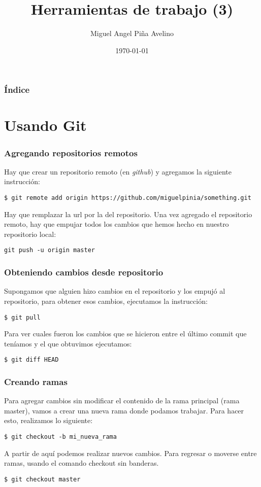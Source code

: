 \documentclass{beamer}
\title[Laboratorio]{Herramientas de trabajo (3)}
\author[Miguel]{Miguel Angel Piña Avelino}
\institute[UNAM]{
  Ingeniería de Software,\\
  Facultad de Ciencias, UNAM
}
\date{\today}
\begin{document}
\frame{\titlepage}
\begin{frame}
  \frametitle{Índice}
  \tableofcontents
\end{frame}

\section{Usando Git}

\begin{frame}[fragile]
  \frametitle{Agregando repositorios remotos}
  Hay que crear un repositorio remoto (en \textit{github}) y agregamos la
  siguiente instrucción:

\begin{verbatim}
$ git remote add origin https://github.com/miguelpinia/something.git
\end{verbatim}

Hay que remplazar la url por la del repositorio. Una vez agregado el repositorio
remoto, hay que empujar todos los cambios que hemos hecho en nuestro repositorio
local:

\begin{verbatim}
git push -u origin master
\end{verbatim}

\end{frame}

\begin{frame}[fragile]
  \frametitle{Obteniendo cambios desde repositorio}

  Supongamos que alguien hizo cambios en el repositorio y los empujó al
repositorio, para obtener esos cambios, ejecutamos la instrucción:

\begin{verbatim}
$ git pull
\end{verbatim}

Para ver cuales fueron los cambios que se hicieron entre el último commit que
teníamos y el que obtuvimos ejecutamos:

\begin{verbatim}
$ git diff HEAD
\end{verbatim}

\end{frame}

\begin{frame}[fragile]
  \frametitle{Creando ramas}
  Para agregar cambios sin modificar el contenido de la rama principal
  (rama master), vamos a crear una nueva rama donde podamos
  trabajar. Para hacer esto, realizamos lo siguiente:

\begin{verbatim}
$ git checkout -b mi_nueva_rama
\end{verbatim}

A partir de aquí podemos realizar nuevos cambios. Para regresar o
moverse entre ramas, usando el comando checkout sin banderas.

\begin{verbatim}
$ git checkout master
\end{verbatim}

\end{frame}
\end{document}
